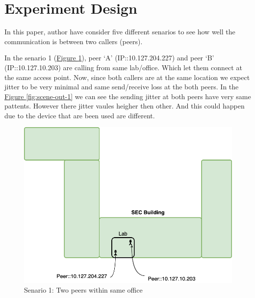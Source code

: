 \section{Experiment Design}	\label{sec:experiments}
	In this paper, author have consider five different senarios to see how well the communication is between two callers (peers). 
	
	In the senario 1 (\hyperref[fig:scene-1]{Figure \ref{fig:scene-1}}), peer `A' (IP::10.127.204.227) and peer `B' (IP::10.127.10.203) are calling from same lab/office. Which let them connect at the same access point. Now, since both callers are at the same location we expect jitter to be very minimal and same send/receive loss at the both peers. In the \hyperref[fig:scene-out-1]{Figure \ref{fig:scene-out-1}} we can see the sending jitter at both peers have very same pattents. However there jitter vaules heigher then other. And this could happen due to the device that are been used are different. 
	\begin{figure}[thb]
		\begin{minipage}{\textwidth}
			\includegraphics[scale=0.29]{Images/experiment/senarios/in_lab.drawio.png}
		\end{minipage}
		\caption{Senario 1: Two peers within same office}
		\label{fig:scene-1}
	\end{figure}

